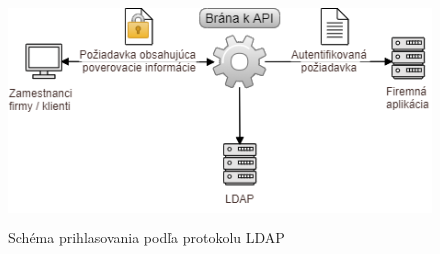 \begin{figure}[H]
\begin{center}\includegraphics[width=\textwidth,height=6cm,keepaspectratio=true]{assets/ldap_schema.png}\end{center}
\caption[Schéma prihlasovania podľa protokolu LDAP]{Schéma prihlasovania podľa protokolu LDAP}\label{fig:obr_5}
\end{figure}

